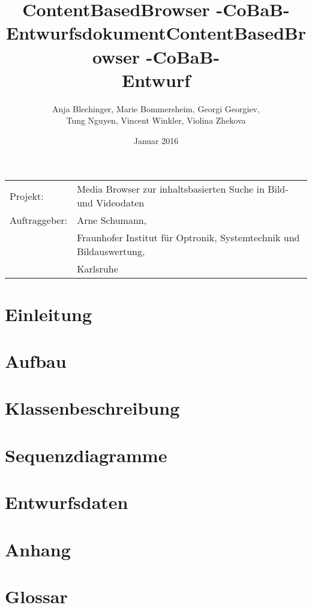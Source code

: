 \documentclass[parskip=full]{scrartcl}
\title{ContentBasedBrowser -CoBaB- \\ Entwurfsdokument}
\begin{document}
\begin{titlepage}
\title{ContentBasedBrowser -CoBaB- \\ Entwurf}
\author{Anja Blechinger, Marie Bommersheim, Georgi Georgiev,\\ Tung Nguyen, Vincent Winkler, Violina Zhekova}
\date{Januar 2016}
\maketitle
\vspace{300pt}
\begin{tabular}{l l}
Projekt: & Media Browser zur inhaltsbasierten Suche in Bild- und Videodaten\\
Auftraggeber: & Arne Schumann,\\
 & Fraunhofer Institut für Optronik, Systemtechnik und Bildauswertung,\\
 & Karlsruhe\\
\end{tabular}
\thispagestyle{empty}
\end{titlepage}
\setcounter{page}{1}

\tableofcontents
\pagebreak

\section{Einleitung}

\pagebreak

\section{Aufbau}

\pagebreak

\section{Klassenbeschreibung}

\pagebreak

\section{Sequenzdiagramme}

\pagebreak

\section{Entwurfsdaten}

\pagebreak

\section{Anhang}

\pagebreak

\section{Glossar}
\end{document}
